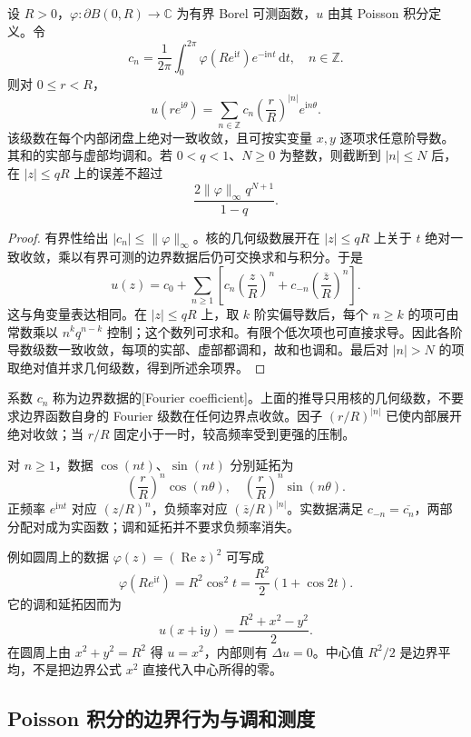 \begin{proposition}[角频率的延拓与衰减]\label{b3:prop:16-poisson-frequencies}
设 \(R>0\)，\(\varphi:\partial B(0,R)\to\mathbb C\) 为有界 Borel 可测函数，\(u\) 由其 Poisson 积分定义。令
\[
 c_n=\frac1{2\pi}\int_0^{2\pi}
       \varphi(Re^{\mathrm i t})e^{-\mathrm i nt}\,\mathrm dt,
 \quad n\in\mathbb Z.
\]
则对 \(0\le r<R\)，
\[
 u(re^{\mathrm i\theta})
 =\sum_{n\in\mathbb Z}c_n
       \left(\frac rR\right)^{|n|}e^{\mathrm i n\theta}.
\]
该级数在每个内部闭盘上绝对一致收敛，且可按实变量 \(x,y\) 逐项求任意阶导数。其和的实部与虚部均调和。若 \(0<q<1\)、\(N\ge0\) 为整数，则截断到 \(|n|\le N\) 后，在 \(|z|\le qR\) 上的误差不超过
\[
 \frac{2\|\varphi\|_\infty q^{N+1}}{1-q}.
\]
\end{proposition}
\begin{proof}
有界性给出 \(|c_n|\le\|\varphi\|_\infty\)。核的几何级数展开在 \(|z|\le qR\) 上关于 \(t\) 绝对一致收敛，乘以有界可测的边界数据后仍可交换求和与积分。于是
\[
 u(z)=c_0+\sum_{n\ge1}
 \left[c_n\left(\frac zR\right)^n+
       c_{-n}\left(\frac{\overline z}R\right)^n\right].
\]
这与角变量表达相同。在 \(|z|\le qR\) 上，取 \(k\) 阶实偏导数后，每个 \(n\ge k\) 的项可由常数乘以 \(n^kq^{n-k}\) 控制；这个数列可求和。有限个低次项也可直接求导。因此各阶导数级数一致收敛，每项的实部、虚部都调和，故和也调和。最后对 \(|n|>N\) 的项取绝对值并求几何级数，得到所述余项界。
\end{proof}

系数 \(c_n\) 称为边界数据的[Fourier coefficient]。上面的推导只用核的几何级数，不要求边界函数自身的 Fourier 级数在任何边界点收敛。因子 \((r/R)^{|n|}\) 已使内部展开绝对收敛；当 \(r/R\) 固定小于一时，较高频率受到更强的压制。

\ProseParagraphBreak
对 \(n\ge1\)，数据 \(\cos(nt)\)、\(\sin(nt)\) 分别延拓为
\[
 \left(\frac rR\right)^n\cos(n\theta),
 \quad
 \left(\frac rR\right)^n\sin(n\theta).
\]
正频率 \(e^{\mathrm i nt}\) 对应 \((z/R)^n\)，负频率对应 \((\overline z/R)^{|n|}\)。实数据满足 \(c_{-n}=\overline{c_n}\)，两部分配对成为实函数；调和延拓并不要求负频率消失。

\ProseParagraphBreak
例如圆周上的数据 \(\varphi(z)=(\operatorname{Re}z)^2\) 可写成
\[
 \varphi(Re^{\mathrm i t})
 =R^2\cos^2t=\frac{R^2}{2}(1+\cos2t).
\]
它的调和延拓因而为
\[
 u(x+\mathrm i y)=\frac{R^2+x^2-y^2}{2}.
\]
在圆周上由 \(x^2+y^2=R^2\) 得 \(u=x^2\)，内部则有 \(\Delta u=0\)。中心值 \(R^2/2\) 是边界平均，不是把边界公式 \(x^2\) 直接代入中心所得的零。

\subsection{Poisson 积分的边界行为与调和测度}
\label{b3:subsec:160104}

